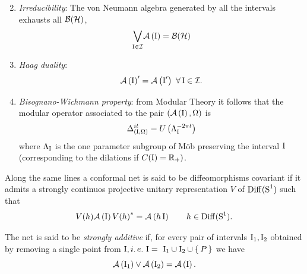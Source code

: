 \begin{definition}
\begin{enumerate}[resume]
\[         \]
   \item \emph{Irreducibility}: The von Neumann algebra generated
         by all the intervals exhausts all $\mathcal{B}(\mathcal{H})$, \ie
         \[
         \underset{\textrm{I}\in\mathcal{I}}{\bigvee}\mathcal{A}\left(\textrm{I}\right)=\mathcal{B}(\mathcal{H})
         \]
   \item \emph{Haag duality}:
         \[
         \alg{\I}'=\alg{\I'}\ \forall\,\I\in\mathcal{I}.
         \]
   \item \emph{Bisognano-Wichmann property}: from Modular Theory it
         follows that the modular operator associated to the pair
         $\left(\mathcal{A}\left(\textrm{I}\right),\Omega\right)$ is
         \[
         \Delta^{it}_{\left(\textrm{I},\Omega\right)}=
         U\left(\Lambda_{\textrm{I}}^{-2\pi t}\right)
         \]
         where $\Lambda_{\textrm{I}}$ is the one parameter subgroup of
         M\"ob preserving the interval $\textrm{I}$ (corresponding to
         the dilations if $C(\textrm{I})=\mathbb{R}_+)$.
  \end{enumerate}
\end{definition}
Along the same lines a conformal net is said to be diffeomorphisms
covariant if it admits a strongly continuos projective unitary 
representation $V$ of $\operatorname{Diff}(\textrm{S}^1)$ such that
\[
V(h)\mathcal{A}\left(\textrm{I}\right){V(h)}^*=\mathcal{A}\left(h\,\textrm{I}\right)\qquad h\in\operatorname{Diff}(\textrm{S}^1).
\]
\begin{definition}
The net is said to be \emph{strongly additive} if, for every
pair of intervals $\textrm{I}_1,\textrm{I}_2$ obtained by removing a single point
from $\I, \ie\ \I=~\I_1\cup\I_2\cup\set{P}$ we have
\[
\mathcal{A}\left(\textrm{I}_1\right)\vee\mathcal{A}\left(\textrm{I}_2\right)=\mathcal{A}\left(\textrm{I}\right).
\]
\end{definition}
